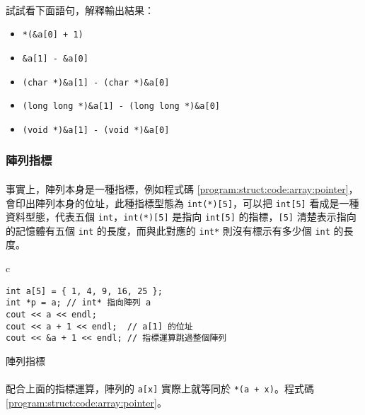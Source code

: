 \documentclass[12pt,a4paper,oneside]{report}
\begin{document}
\begin{CJK}{UTF8}{bkai}
\paragraph{}試試看下面語句，解釋輸出結果：

\begin{itemize}
\item \lstinline!*(&a[0] + 1)!
\item \lstinline!&a[1] - &a[0]!
\item \lstinline!(char *)&a[1] - (char *)&a[0]!
\item \lstinline!(long long *)&a[1] - (long long *)&a[0]!
\item \lstinline!(void *)&a[1] - (void *)&a[0]!
\end{itemize}

\subsubsection{陣列指標}

\paragraph{}事實上，陣列本身是一種指標，例如程式碼 \ref{program:struct:code:array:pointer}，會印出陣列本身的位址，此種指標型態為 \lstinline!int(*)[5]!，可以把 \lstinline!int[5]! 看成是一種資料型態，代表五個 \lstinline!int!，\lstinline!int(*)[5]! 是指向 \lstinline!int[5]! 的指標，\lstinline![5]! 清楚表示指向的記憶體有五個 \lstinline!int! 的長度，而與此對應的 \lstinline!int*! 則沒有標示有多少個 \lstinline!int! 的長度。

\begin{code}[h!]
\centering
\begin{tabular}{c}
\begin{lstlisting}
int a[5] = { 1, 4, 9, 16, 25 };
int *p = a; // int* 指向陣列 a
cout << a << endl;
cout << a + 1 << endl;  // a[1] 的位址
cout << &a + 1 << endl; // 指標運算跳過整個陣列
\end{lstlisting}
\end{tabular}
\caption{陣列指標}
\label{program:struct:code:array:pointer}
\end{code}

\paragraph{}配合上面的指標運算，陣列的 \lstinline!a[x]! 實際上就等同於 \lstinline!*(a + x)!。程式碼 \ref{program:struct:code:array:pointer}。


\end{CJK}
\end{document}
